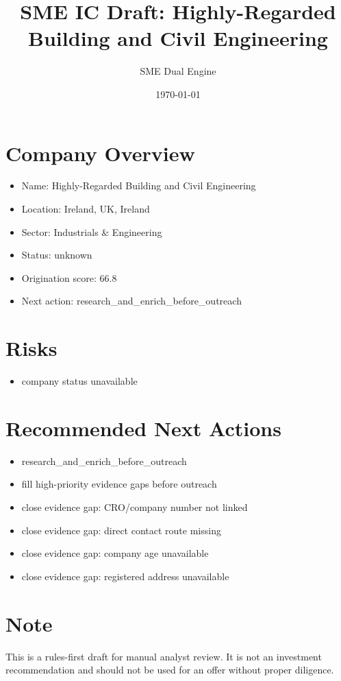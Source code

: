 \documentclass[11pt,a4paper]{article}
\title{SME IC Draft: Highly-Regarded Building and Civil Engineering}
\author{SME Dual Engine}
\date{\today}
\begin{document}
\maketitle
\section*{Company Overview}
\begin{itemize}[leftmargin=1.4em]
\item Name: Highly-Regarded Building and Civil Engineering
\item Location: Ireland, UK, Ireland
\item Sector: Industrials \& Engineering
\item Status: unknown
\item Origination score: 66.8
\item Next action: research\_and\_enrich\_before\_outreach
\end{itemize}
\section*{Risks}
\begin{itemize}[leftmargin=1.4em]
\item company status unavailable
\end{itemize}
\section*{Recommended Next Actions}
\begin{itemize}[leftmargin=1.4em]
\item research\_and\_enrich\_before\_outreach
\item fill high-priority evidence gaps before outreach
\item close evidence gap: CRO/company number not linked
\item close evidence gap: direct contact route missing
\item close evidence gap: company age unavailable
\item close evidence gap: registered address unavailable
\end{itemize}
\section*{Note}
This is a rules-first draft for manual analyst review. It is not an investment
recommendation and should not be used for an offer without proper diligence.
\end{document}
